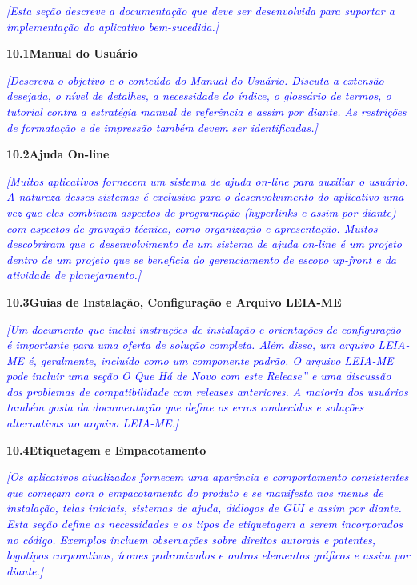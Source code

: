 \documentclass[a4paper]{article}
\begin{document}
\textit{\textcolor{blue}{[Esta se\c{c}\~ao descreve a documenta\c{c}\~ao que deve ser desenvolvida para suportar a
implementa\c{c}\~ao do aplicativo bem-sucedida.]}}

\hypertarget{evarep984nyh}{}\textbf{10.1Manual do Usu\'ario}

\textit{\textcolor{blue}{[Descreva o objetivo e o conte\'udo do Manual do Usu\'ario. Discuta a extens\~ao desejada, o
n\'ivel de detalhes, a necessidade do \'indice, o gloss\'ario de termos, o tutorial contra a estrat\'egia manual de
refer\^encia e assim por diante. As restri\c{c}\~oes de formata\c{c}\~ao e de impress\~ao tamb\'em devem ser
identificadas.]}}

\hypertarget{v49gfq4f3jh2}{}\textbf{10.2Ajuda On-line}

\textit{\textcolor{blue}{[Muitos aplicativos fornecem um sistema de ajuda on-line para auxiliar o usu\'ario. A natureza
desses sistemas \'e exclusiva para o desenvolvimento do aplicativo uma vez que eles combinam aspectos de
programa\c{c}\~ao (hyperlinks e assim por diante) com aspectos de grava\c{c}\~ao t\'ecnica, como organiza\c{c}\~ao e
apresenta\c{c}\~ao. Muitos descobriram que o desenvolvimento de um sistema de ajuda on-line \'e um projeto dentro de um
projeto que se beneficia do gerenciamento de escopo up-front e da atividade de planejamento.]}}

\hypertarget{z2a13le9bom}{}\textbf{10.3Guias de Instala\c{c}\~ao, Configura\c{c}\~ao e Arquivo LEIA-ME}

\textit{\textcolor{blue}{[Um documento que inclui instru\c{c}\~oes de instala\c{c}\~ao e orienta\c{c}\~oes de
configura\c{c}\~ao \'e importante para uma oferta de solu\c{c}\~ao completa. Al\'em disso, um arquivo LEIA-ME \'e,
geralmente, inclu\'ido como um componente padr\~ao. O arquivo LEIA-ME pode incluir uma se\c{c}\~ao {\textquotedbl}O Que
H\'a de Novo com este Release'' e uma discuss\~ao dos problemas de compatibilidade com releases anteriores. A maioria
dos usu\'arios tamb\'em gosta da documenta\c{c}\~ao que define os erros conhecidos e solu\c{c}\~oes alternativas no
arquivo LEIA-ME.]}}

\hypertarget{xx2mdyy75im6}{}\textbf{10.4Etiquetagem e Empacotamento}

\textit{\textcolor{blue}{[Os aplicativos atualizados fornecem uma apar\^encia e comportamento consistentes que
come\c{c}am com o empacotamento do produto e se manifesta nos menus de instala\c{c}\~ao, telas iniciais, sistemas de
ajuda, di\'alogos de GUI e assim por diante. Esta se\c{c}\~ao define as necessidades e os tipos de etiquetagem a serem
incorporados no c\'odigo. Exemplos incluem observa\c{c}\~oes sobre direitos autorais e patentes, logotipos
corporativos, \'icones padronizados e outros elementos gr\'aficos e assim por diante.]}}
\end{document}
